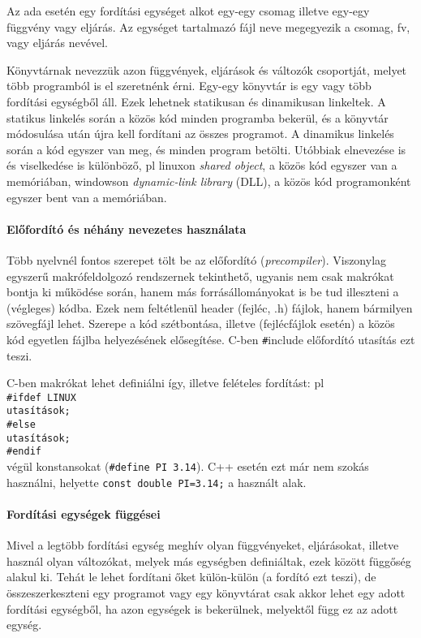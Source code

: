 \documentclass[fleqn,10pt,a4paper]{article}
\newcommand{\ut}[1]{\texttt{#1}}
\theoremstyle{magyar}
\begin{document}
  Az ada esetén egy fordítási egységet alkot egy-egy csomag illetve
  egy-egy függvény vagy eljárás. Az egységet tartalmazó fájl neve
  megegyezik a csomag, fv, vagy eljárás nevével.
  
  Könyvtárnak nevezzük azon függvények, eljárások és változók
  csoportját, melyet több programból is el szeretnénk érni. Egy-egy
  könyvtár is egy vagy több fordítási egységből áll. Ezek lehetnek
  statikusan és dinamikusan linkeltek. A statikus linkelés során a
  közös kód minden programba bekerül, és a könyvtár módosulása után
  újra kell fordítani az összes programot. A dinamikus linkelés során
  a kód egyszer van meg, és minden program betölti. Utóbbiak
  elnevezése is és viselkedése is különböző, pl linuxon \emph{shared
  object}, a közös kód egyszer van a memóriában, windowson
  \emph{dynamic-link library} (DLL), a közös kód programonként egyszer
  bent van a memóriában.

  \paragraph{Előfordító és néhány nevezetes használata}
  Több nyelvnél fontos szerepet tölt be az előfordító
  (\emph{precompiler}). Viszonylag egyszerű makrófeldolgozó
  rendszernek tekinthető, ugyanis nem csak makrókat bontja ki működése
  során, hanem más forrásállományokat is be tud illeszteni a (végleges)
  kódba. Ezek nem feltétlenül header (fejléc, .h) fájlok, hanem
  bármilyen szövegfájl lehet. Szerepe a kód szétbontása, illetve
  (fejlécfájlok esetén) a közös kód egyetlen fájlba helyezésének
  elősegítése. C-ben \ut \#include előfordító utasítás ezt teszi.

  C-ben makrókat lehet definiálni így, illetve felételes fordítást:
  pl\\
  \ut{\#ifdef LINUX\\
    \hspace*{0.5em}utasítások;\\
    \#else\\
    \hspace*{0.5em}utasítások;\\
    \#endif}\\
  végül konstansokat (\ut{\#define PI 3.14}). C++ esetén ezt már
  nem szokás használni, helyette \ut{const double PI=3.14;} a
  használt alak.
    
  \paragraph{Fordítási egységek függései}
  Mivel a legtöbb fordítási egység meghív olyan függvényeket,
  eljárásokat, illetve használ olyan változókat, melyek más egységben
  definiáltak, ezek között függőség alakul ki. Tehát le lehet
  fordítani őket külön-külön (a fordító ezt teszi), de
  összeszerkeszteni egy programot vagy egy könyvtárat csak akkor lehet
  egy adott fordítási egységből, ha azon egységek is bekerülnek,
  melyektől függ ez az adott egység.
  
\end{document}

